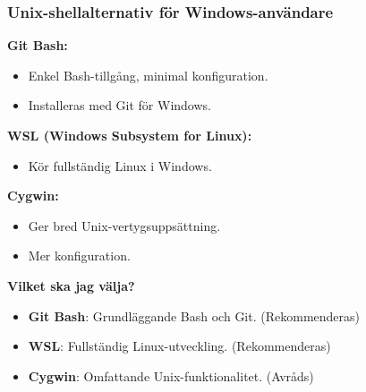 \begin{frame}[fragile=singleslide]
    \frametitle{Unix-shellalternativ för Windows-användare}

    \textbf{Git Bash:}
    \begin{itemize}
        \item Enkel Bash-tillgång, minimal konfiguration.
        \item Installeras med Git för Windows.
    \end{itemize}

    \textbf{WSL (Windows Subsystem for Linux):}
    \begin{itemize}
        \item Kör fullständig Linux i Windows.
    \end{itemize}

    \textbf{Cygwin:}
    \begin{itemize}
        \item Ger bred Unix-vertygsuppsättning.
        \item Mer konfiguration.
    \end{itemize}

    \blankline
    \textbf{Vilket ska jag välja?}
    \begin{itemize}
        \item \textbf{Git Bash}: Grundläggande Bash och Git. (Rekommenderas)
        \item \textbf{WSL}: Fullständig Linux-utveckling. (Rekommenderas)
        \item \textbf{Cygwin}: Omfattande Unix-funktionalitet. (Avråds)
    \end{itemize}

\end{frame}





